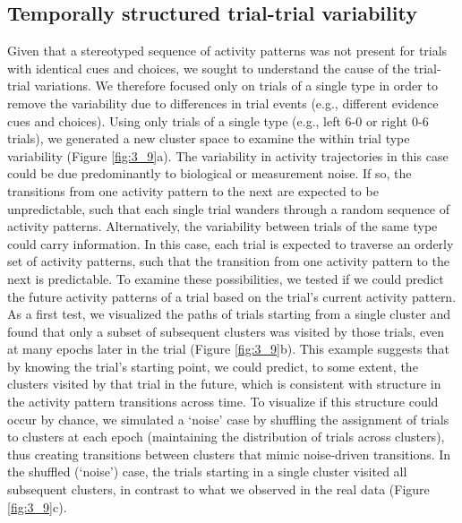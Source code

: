 \subsection{Temporally structured trial-trial variability} \label{sec:chap3_temp_struc}

Given that a stereotyped sequence of activity patterns was not present for trials with identical cues and choices, we sought to understand the cause of the trial-trial variations. We therefore focused only on trials of a single type in order to remove the variability due to differences in trial events (e.g., different evidence cues and choices). Using only trials of a single type (e.g., left 6-0 or right 0-6 trials), we generated a new cluster space to examine the within trial type variability (Figure \ref{fig:3_9}a). The variability in activity trajectories in this case could be due predominantly to biological or measurement noise. If so, the transitions from one activity pattern to the next are expected to be unpredictable, such that each single trial wanders through a random sequence of activity patterns. Alternatively, the variability between trials of the same type could carry information. In this case, each trial is expected to traverse an orderly set of activity patterns, such that the transition from one activity pattern to the next is predictable. To examine these possibilities, we tested if we could predict the future activity patterns of a trial based on the trial’s current activity pattern. As a first test, we visualized the paths of trials starting from a single cluster and found that only a subset of subsequent clusters was visited by those trials, even at many epochs later in the trial (Figure \ref{fig:3_9}b). This example suggests that by knowing the trial’s starting point, we could predict, to some extent, the clusters visited by that trial in the future, which is consistent with structure in the activity pattern transitions across time. To visualize if this structure could occur by chance, we simulated a ‘noise’ case by shuffling the assignment of trials to clusters at each epoch (maintaining the distribution of trials across clusters), thus creating transitions between clusters that mimic noise-driven transitions. In the shuffled (‘noise’) case, the trials starting in a single cluster visited all subsequent clusters, in contrast to what we observed in the real data (Figure \ref{fig:3_9}c).
 

